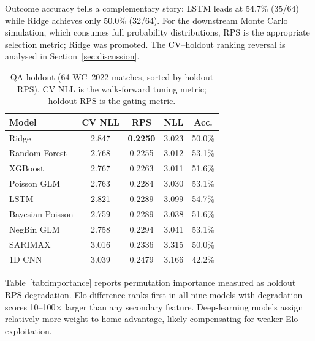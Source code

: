 \documentclass[conference]{IEEEtran}
\begin{document}
Outcome accuracy tells a complementary story: LSTM leads at 54.7\% (35/64)
while Ridge achieves only 50.0\% (32/64).
For the downstream Monte Carlo simulation, which consumes full probability
distributions, RPS is the appropriate selection metric; Ridge was promoted.
The CV--holdout ranking reversal is analysed in
Section~\ref{sec:discussion}.

\begin{table}[h]
  \caption{QA holdout (64 WC~2022 matches, sorted by holdout RPS).
  CV NLL is the walk-forward tuning metric; holdout RPS is the gating
  metric.}
  \label{tab:qa_results}
  \begin{tabular}{@{}lcccc@{}}
    \toprule
    Model & CV NLL & RPS & NLL & Acc. \\
    \midrule
    Ridge            & 2.847 & \textbf{0.2250} & 3.023 & 50.0\% \\
    Random Forest    & 2.768 & 0.2255 & 3.012 & 53.1\% \\
    XGBoost          & 2.767 & 0.2263 & 3.011 & 51.6\% \\
    Poisson GLM      & 2.763 & 0.2284 & 3.030 & 53.1\% \\
    LSTM             & 2.821 & 0.2289 & 3.099 & 54.7\% \\
    Bayesian Poisson & 2.759 & 0.2289 & 3.038 & 51.6\% \\
    NegBin GLM       & 2.758 & 0.2294 & 3.041 & 53.1\% \\
    SARIMAX          & 3.016 & 0.2336 & 3.315 & 50.0\% \\
    1D CNN           & 3.039 & 0.2479 & 3.166 & 42.2\% \\
    \bottomrule
  \end{tabular}
\end{table}

Table~\ref{tab:importance} reports permutation importance measured as holdout
RPS degradation.
Elo difference ranks first in all nine models with degradation scores
10--100$\times$ larger than any secondary feature.
Deep-learning models assign relatively more weight to home advantage, likely
compensating for weaker Elo exploitation.
\end{document}
